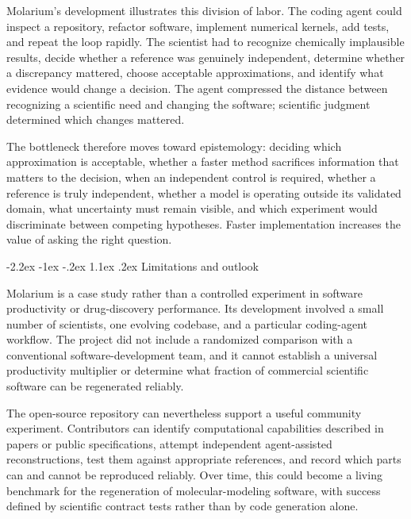 \documentclass[11pt]{article}
\makeatletter
\renewcommand\section{\@startsection{section}{1}{\z@}%
  {-2.2ex \@plus -1ex \@minus -.2ex}%
  {1.1ex \@plus .2ex}%
  {\normalfont\Large\bfseries\color{molblue}}}
\makeatother
\begin{document}
Molarium's development illustrates this division of labor. The coding agent could inspect a repository, refactor software, implement numerical kernels, add tests, and repeat the loop rapidly. The scientist had to recognize chemically implausible results, decide whether a reference was genuinely independent, determine whether a discrepancy mattered, choose acceptable approximations, and identify what evidence would change a decision. The agent compressed the distance between recognizing a scientific need and changing the software; scientific judgment determined which changes mattered.

The bottleneck therefore moves toward epistemology: deciding which approximation is acceptable, whether a faster method sacrifices information that matters to the decision, when an independent control is required, whether a reference is truly independent, whether a model is operating outside its validated domain, what uncertainty must remain visible, and which experiment would discriminate between competing hypotheses. Faster implementation increases the value of asking the right question.

\section{Limitations and outlook}

Molarium is a case study rather than a controlled experiment in software productivity or drug-discovery performance. Its development involved a small number of scientists, one evolving codebase, and a particular coding-agent workflow. The project did not include a randomized comparison with a conventional software-development team, and it cannot establish a universal productivity multiplier or determine what fraction of commercial scientific software can be regenerated reliably.

The open-source repository can nevertheless support a useful community experiment. Contributors can identify computational capabilities described in papers or public specifications, attempt independent agent-assisted reconstructions, test them against appropriate references, and record which parts can and cannot be reproduced reliably. Over time, this could become a living benchmark for the regeneration of molecular-modeling software, with success defined by scientific contract tests rather than by code generation alone.
\end{document}
